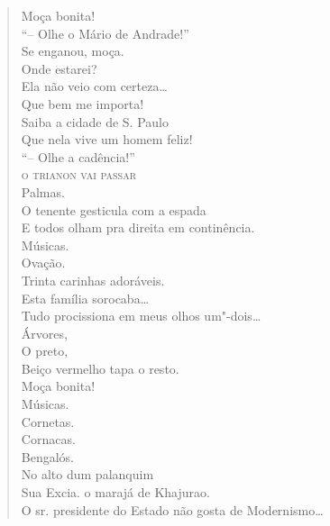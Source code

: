 \begin{verse}
Moça bonita!\\
``-- Olhe o Mário de Andrade!''\\
Se enganou, moça.\\
Onde estarei?\\
Ela não veio com certeza\ldots{}\\
Que bem me importa!\\
Saiba a cidade de S. Paulo\\
Que nela vive um homem feliz!\\
``-- Olhe a cadência!''\\
\textsc{o trianon vai passar}\\
Palmas.\\
O tenente gesticula com a espada\\
E todos olham pra direita em continência.\\
Músicas.\\
Ovação.\\
Trinta carinhas adoráveis.\\
Esta família sorocaba\ldots{}\\
Tudo procissiona em meus olhos um"-dois\ldots{}\\
Árvores,\\
O preto,\\
Beiço vermelho tapa o resto.\\
Moça bonita!\\
Músicas.\\
Cornetas.\\
Cornacas.\\
Bengalós.\\
No alto dum palanquim\\
Sua Excia. o marajá de Khajurao.\\
O sr. presidente do Estado não gosta de Modernismo\ldots{}


\end{verse}
